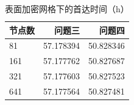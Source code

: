 \begin{table}[!htbp]\centering
\caption{表面加密网格下的首达时间（h）}
\begin{tabular}{lrr}\toprule
节点数 & 问题三 & 问题四\\\midrule
81 & 57.178394 & 50.828346\\
161 & 57.177762 & 50.827687\\
321 & 57.177603 & 50.827523\\
641 & 57.177564 & 50.827481\\
\bottomrule\end{tabular}\end{table}
